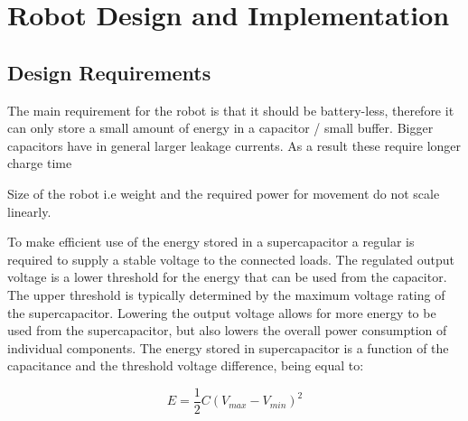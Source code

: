 \chapter{Robot Design and Implementation}


\section{Design Requirements}



The main requirement for the robot is  that it should be battery-less, therefore it can only store a small amount of energy in a capacitor / small buffer.
Bigger capacitors have in general larger leakage currents.
As a result these require longer charge time

Size of the robot i.e weight and the required power for movement do not scale linearly.


To make efficient use of the energy stored in a supercapacitor a regular is required to supply a stable voltage to the connected loads.
The regulated output voltage is a lower threshold for the energy that can be used from the capacitor.
The upper threshold is typically determined by the maximum voltage rating of the supercapacitor.
Lowering the output voltage allows for more energy to be used from the supercapacitor, but also lowers the overall power consumption of individual components.
The energy stored in supercapacitor is a function of the capacitance and the threshold voltage difference, being equal to:

\begin{equation}
\label{eq:cap2}
E = \frac{1}{2}C(V_{max} - V_{min})^{2}
\end{equation}


